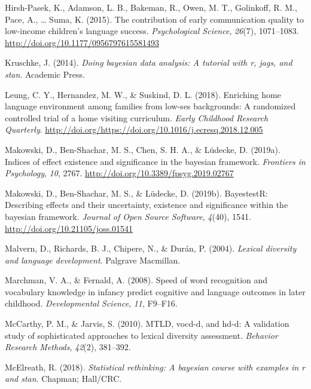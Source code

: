 \documentclass[man,floatsintext]{apa6}
\begin{document}
\leavevmode\hypertarget{ref-HirshPasek2015}{}%
Hirsh-Pasek, K., Adamson, L. B., Bakeman, R., Owen, M. T., Golinkoff, R. M., Pace, A., \ldots{} Suma, K. (2015). The contribution of early communication quality to low-income children's language success. \emph{Psychological Science}, \emph{26}(7), 1071--1083. \url{http://doi.org/10.1177/0956797615581493}

\leavevmode\hypertarget{ref-Kruschke2014}{}%
Kruschke, J. (2014). \emph{Doing bayesian data analysis: A tutorial with r, jags, and stan}. Academic Press.

\leavevmode\hypertarget{ref-Leung2018}{}%
Leung, C. Y., Hernandez, M. W., \& Suskind, D. L. (2018). Enriching home language environment among families from low-ses backgrounds: A randomized controlled trial of a home visiting curriculum. \emph{Early Childhood Research Quarterly}. \url{http://doi.org/https://doi.org/10.1016/j.ecresq.2018.12.005}

\leavevmode\hypertarget{ref-Makowski2019}{}%
Makowski, D., Ben-Shachar, M. S., Chen, S. H. A., \& Lüdecke, D. (2019a). Indices of effect existence and significance in the bayesian framework. \emph{Frontiers in Psychology}, \emph{10}, 2767. \url{http://doi.org/10.3389/fpsyg.2019.02767}

\leavevmode\hypertarget{ref-bayestestR}{}%
Makowski, D., Ben-Shachar, M. S., \& Lüdecke, D. (2019b). BayestestR: Describing effects and their uncertainty, existence and significance within the bayesian framework. \emph{Journal of Open Source Software}, \emph{4}(40), 1541. \url{http://doi.org/10.21105/joss.01541}

\leavevmode\hypertarget{ref-Malvern2004}{}%
Malvern, D., Richards, B. J., Chipere, N., \& Durán, P. (2004). \emph{Lexical diversity and language development}. Palgrave Macmillan.

\leavevmode\hypertarget{ref-Marchman2008}{}%
Marchman, V. A., \& Fernald, A. (2008). Speed of word recognition and vocabulary knowledge in infancy predict cognitive and language outcomes in later childhood. \emph{Developmental Science}, \emph{11}, F9--F16.

\leavevmode\hypertarget{ref-McCarthy2010}{}%
McCarthy, P. M., \& Jarvis, S. (2010). MTLD, vocd-d, and hd-d: A validation study of sophisticated approaches to lexical diversity assessment. \emph{Behavior Research Methods}, \emph{42}(2), 381--392.

\leavevmode\hypertarget{ref-McElreath2018}{}%
McElreath, R. (2018). \emph{Statistical rethinking: A bayesian course with examples in r and stan}. Chapman; Hall/CRC.
\end{document}
